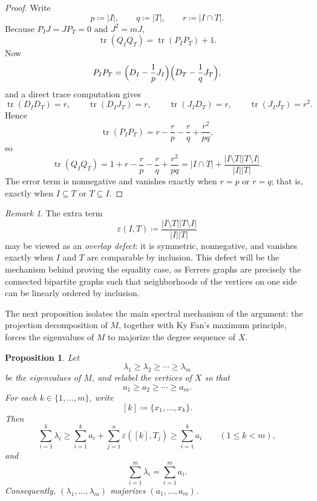 \documentclass[twoside, reqno]{amsart}
\newtheorem{proposition}[theorem]{Proposition}
\theoremstyle{definition}
\theoremstyle{remark}
\newtheorem{remark}[theorem]{Remark}
\newcommand{\epsov}{\varepsilon}
\begin{document}
\begin{proof}
Write
\[
p\coloneqq |I|,\qquad q\coloneqq |T|,\qquad r\coloneqq |I\cap T|.
\]
Because $P_IJ=JP_T=0$ and $J^2=mJ$,
\[
\operatorname{tr}(Q_IQ_T)=\operatorname{tr}(P_IP_T)+1.
\]
Now
\[
P_IP_T=\Bigl(D_I-\frac{1}{p}J_I\Bigr)\Bigl(D_T-\frac{1}{q}J_T\Bigr),
\]
and a direct trace computation gives
\[
\operatorname{tr}(D_ID_T)=r,
\qquad
\operatorname{tr}(D_IJ_T)=r,
\qquad
\operatorname{tr}(J_ID_T)=r,
\qquad
\operatorname{tr}(J_IJ_T)=r^2.
\]
Hence
\[
\operatorname{tr}(P_IP_T)=r-\frac{r}{p}-\frac{r}{q}+\frac{r^2}{pq},
\]
so
\[
\operatorname{tr}(Q_IQ_T)
=
1+r-\frac{r}{p}-\frac{r}{q}+\frac{r^2}{pq}
=
|I\cap T|+\frac{|I\setminus T||T\setminus I|}{|I||T|}.
\]
The error term is nonnegative and vanishes exactly when $r=p$ or $r=q$; 
that is, exactly when $I\subseteq T$ or $T\subseteq I$.
\end{proof}

\begin{remark}
The extra term
\[
\epsov(I,T)\coloneqq \frac{|I\setminus T||T\setminus I|}{|I||T|}
\]
may be viewed as an \emph{overlap defect}: it is symmetric, nonnegative, 
and vanishes exactly when $I$ and $T$ are comparable by inclusion. 
This defect will be the mechanism behind proving the equality case, 
as Ferrers graphs are precisely the connected bipartite graphs such that 
neighborhoods of the vertices on one side can be linearly ordered by inclusion.
\end{remark}

The next proposition isolates the main spectral mechanism of the argument:
the projection decomposition of $M$, together with Ky Fan's maximum principle,
forces the eigenvalues of $M$ to majorize the degree sequence of $X$.

\begin{proposition}\label{prop:majorization}
Let
\[
\lambda_1\ge \lambda_2\ge \cdots \ge \lambda_m
\]
be the eigenvalues of $M$, and relabel the vertices of $X$ so that
\[
a_1\ge a_2\ge \cdots \ge a_m.
\]
For each $k\in\{1,\dots,m\}$, write
\[
[k]\coloneqq \{x_1,\dots,x_k\}.
\]
Then
\begin{equation}\label{eq:partial-sum-ineq}
\sum_{i=1}^k \lambda_i
\ge
\sum_{i=1}^k a_i+\sum_{j=1}^n \epsov([k],T_j)
\ge
\sum_{i=1}^k a_i
\qquad (1\le k<m),
\end{equation}
and
\[
\sum_{i=1}^m \lambda_i=\sum_{i=1}^m a_i.
\]
Consequently, $(\lambda_1,\dots,\lambda_m)$ majorizes $(a_1,\dots,a_m)$.
\end{proposition}
\end{document}
